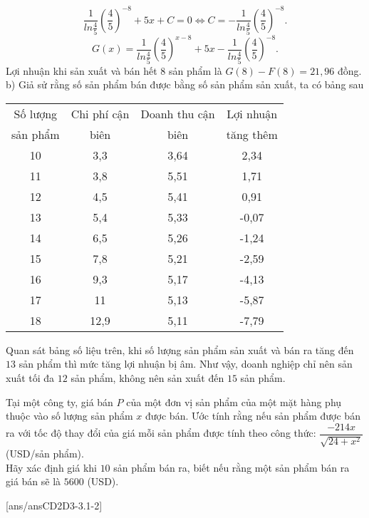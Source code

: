 \begin{vd}
{		\[\dfrac{1}{ln\frac{4}{5}}\left(\dfrac{4}{5}\right)^{-8}+5x+C=0\Leftrightarrow C=-\dfrac{1}{ln\frac{4}{5}}\left(\dfrac{4}{5}\right)^{-8}.\]
		\[G(x)= \dfrac{1}{ln\frac{4}{5}}\left(\dfrac{4}{5}\right)^{x-8}+5x-\dfrac{1}{ln\frac{4}{5}}\left(\dfrac{4}{5}\right)^{-8}.\]
		Lợi nhuận khi sản xuất và bán hết $8$ sản phẩm là $ G(8)-F(8)=21{,}96$ đồng.\\
		b) Giả sử rằng số sản phẩm bán được bằng số sản phẩm sản xuất, ta có bảng sau
		\begin{longtable}{|c|c|c|c|}
			\hline
			Số lượng&Chi phí cận&Doanh thu cận&Lợi nhuận\\ 
			sản phẩm& biên& biên& tăng thêm\\ \hline
			10&3,3&3,64&2,34\\ \hline
			11&3,8&5,51&1,71\\ \hline
			12&4,5&5,41&0,91\\ \hline
			13&5,4&5,33&-0,07\\ \hline
			14&6,5&5,26&-1,24\\ \hline
			15&7,8&5,21&-2,59\\ \hline
			16&9,3&5,17&-4,13\\ \hline
			17&11&5,13&-5,87\\ \hline
			18&12,9&5,11&-7,79\\ \hline
		\end{longtable}
		Quan sát bảng số liệu trên, khi số lượng sản phẩm sản xuất và bán ra tăng đến $13$ sản phẩm thì mức tăng lợi nhuận bị âm. Như vậy, doanh nghiệp chỉ nên sản xuất tối đa $12$ sản phẩm, không nên sản xuất đến $15$ sản phẩm.}
\end{vd}
\begin{vd}%
	Tại một công ty, giá bán $P$ của một đơn vị sản phẩm của một mặt hàng phụ thuộc vào số lượng sản phẩm $x$ được bán. Ước tính rằng nếu sản phẩm được bán ra với tốc độ thay đổi của giá mỗi sản phẩm được tính theo công thức: $\dfrac{-214x}{\sqrt{24+x^2}}$ (USD/sản phẩm).\\
	Hãy xác định giá khi $10$ sản phẩm bán ra, biết nếu rằng một sản phẩm bán ra giá bán sẽ là $5600$ (USD).
\end{vd}
[ans/ansCD2D3-3.1-2]
